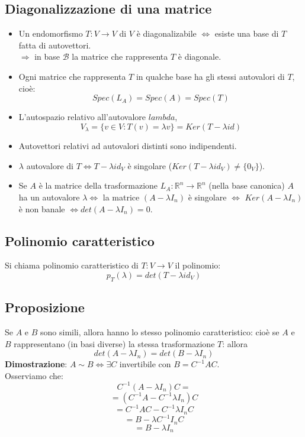 \subsection{Diagonalizzazione di una matrice}
\begin{itemize}
\item Un endomorfismo $T:V\rightarrow V$ di $V$ è diagonalizabile $\Leftrightarrow$ esiste una base di $T$ fatta di autovettori.
  \\$\Rightarrow$ in base $\mathcal{B}$ la matrice che rappresenta $T$ è diagonale.

\item Ogni matrice che rappresenta $T$ in qualche base ha gli stessi autovalori di $T$, cioè:
  \[Spec(L_A)=Spec(A)=Spec(T)\]

\item L'autospazio relativo all'autovalore $lambda$,
  \[V_\lambda=\{v\in V: T(v)=\lambda v\}=Ker(T-\lambda id)\]

\item Autovettori relativi ad autovalori distinti sono indipendenti.

\item $\lambda$ autovalore di $T\Leftrightarrow T-\lambda id_V$ è singolare ($Ker(T-\lambda id_V)\neq\{0_V\}$).

\item Se $A$ è la matrice della trasformazione $L_A:\mathbb{R}^n\rightarrow\mathbb{R}^n$ (nella base canonica) $A$ ha un autovalore $\lambda\Leftrightarrow$ la matrice $(A-\lambda I_n)$ è singolare $\Leftrightarrow$ $Ker(A-\lambda I_n)$ è non banale $\Leftrightarrow det(A-\lambda I_n)=0$.
  
\end{itemize}

\subsection{Polinomio caratteristico}
Si chiama polinomio caratteristico di $T:V\rightarrow V$ il polinomio:
\[p_T(\lambda)=det(T-\lambda id_V)\]

\subsection{Proposizione}
Se $A$ e $B$ sono simili, allora hanno lo stesso polinomio caratteristico: cioè se $A$ e $B$ rappresentano (in basi diverse) la stessa trasformazione $T$: allora
\[det(A-\lambda I_n)=det(B-\lambda I_n)\]
\textbf{Dimostrazione}: $A\sim B\Leftrightarrow \exists C$ invertibile con $B=C^{-1}AC$.
\\Osserviamo che:
\[C^{-1}(A-\lambda I_n)C=\]
\[=(C^{-1}A-C^{-1}\lambda I_n)C\]
\[=C^{-1}AC-C^{-1}\lambda I_nC\]
\[=B-\lambda C^{-1}I_n C\]
\[=B-\lambda I_n\]

